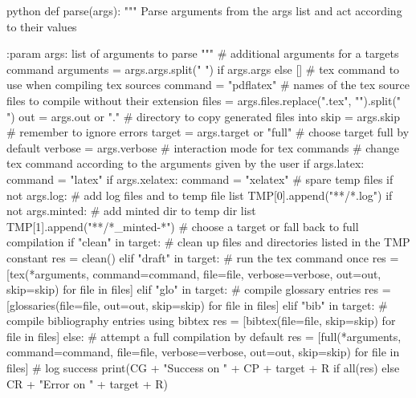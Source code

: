 \documentclass[minted]{protocol}
\begin{document}
\begin{code}{python}
def parse(args):
    """
    Parse arguments from the args list and act according to their values

    :param args: list of arguments to parse
    """
    # additional arguments for a targets command
    arguments = args.args.split(" ") if args.args else []
    # tex command to use when compiling tex sources
    command = "pdflatex"
    # names of the tex source files to compile without their extension
    files = args.files.replace(".tex", "").split(" ")
    out = args.out or "."           # directory to copy generated files into
    skip = args.skip                # remember to ignore errors
    target = args.target or "full"  # choose target full by default
    verbose = args.verbose          # interaction mode for tex commands
    # change tex command according to the arguments given by the user
    if args.latex:
        command = "latex"
    if args.xelatex:
        command = "xelatex"
    # spare temp files
    if not args.log:        # add log files and to temp file list
        TMP[0].append("**/*.log")
    if not args.minted:     # add minted dir to temp dir list
        TMP[1].append("**/*_minted-*")
    # choose a target or fall back to full compilation
    if "clean" in target:       # clean up files and directories listed in the TMP constant
        res = clean()
    elif "draft" in target:     # run the tex command once
        res = [tex(*arguments, command=command, file=file, verbose=verbose, out=out, skip=skip) for file in files]
    elif "glo" in target:       # compile glossary entries
        res = [glossaries(file=file, out=out, skip=skip) for file in files]
    elif "bib" in target:       # compile bibliography entries using bibtex
        res = [bibtex(file=file, skip=skip) for file in files]
    else:                       # attempt a full compilation by default
        res = [full(*arguments, command=command, file=file, verbose=verbose, out=out, skip=skip) for file in files]
    # log success
    print(CG + "Success on " + CP + target + R if all(res) else CR + "Error on " + target + R)



\end{code}
\end{document}
